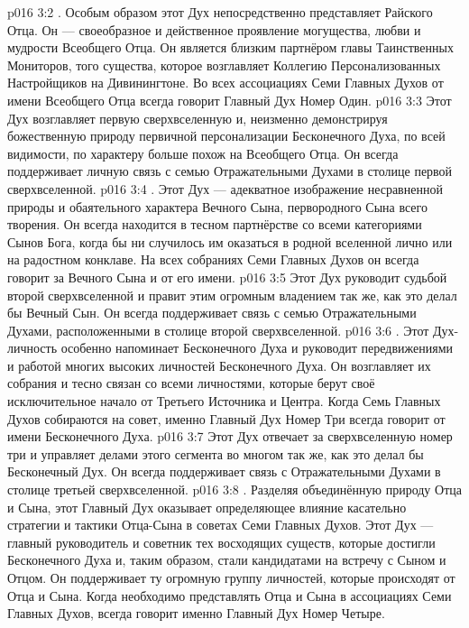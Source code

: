 \vs p016 3:2 . Особым образом этот Дух непосредственно представляет Райского Отца. Он --- своеобразное и действенное проявление могущества, любви и мудрости Всеобщего Отца. Он является близким партнёром главы Таинственных Мониторов, того существа, которое возглавляет Коллегию Персонализованных Настройщиков на Дивинингтоне. Во всех ассоциациях Семи Главных Духов от имени Всеобщего Отца всегда говорит Главный Дух Номер Один.
\vs p016 3:3 Этот Дух возглавляет первую сверхвселенную и, неизменно демонстрируя божественную природу первичной персонализации Бесконечного Духа, по всей видимости, по характеру больше похож на Всеобщего Отца. Он всегда поддерживает личную связь с семью Отражательными Духами в столице первой сверхвселенной.
\vs p016 3:4 \pc {}. Этот Дух --- адекватное изображение несравненной природы и обаятельного характера Вечного Сына, первородного Сына всего творения. Он всегда находится в тесном партнёрстве со всеми категориями Сынов Бога, когда бы ни случилось им оказаться в родной вселенной лично или на радостном конклаве. На всех собраниях Семи Главных Духов он всегда говорит за Вечного Сына и от его имени.
\vs p016 3:5 Этот Дух руководит судьбой второй сверхвселенной и правит этим огромным владением так же, как это делал бы Вечный Сын. Он всегда поддерживает связь с семью Отражательными Духами, расположенными в столице второй сверхвселенной.
\vs p016 3:6 \pc {}. Этот Дух\hyp{}личность особенно напоминает Бесконечного Духа и руководит передвижениями и работой многих высоких личностей Бесконечного Духа. Он возглавляет их собрания и тесно связан со всеми личностями, которые берут своё исключительное начало от Третьего Источника и Центра. Когда Семь Главных Духов собираются на совет, именно Главный Дух Номер Три всегда говорит от имени Бесконечного Духа.
\vs p016 3:7 Этот Дух отвечает за сверхвселенную номер три и управляет делами этого сегмента во многом так же, как это делал бы Бесконечный Дух. Он всегда поддерживает связь с Отражательными Духами в столице третьей сверхвселенной.
\vs p016 3:8 \pc {}. Разделяя объединённую природу Отца и Сына, этот Главный Дух оказывает определяющее влияние касательно стратегии и тактики Отца\hyp{}Сына в советах Семи Главных Духов. Этот Дух --- главный руководитель и советник тех восходящих существ, которые достигли Бесконечного Духа и, таким образом, стали кандидатами на встречу с Сыном и Отцом. Он поддерживает ту огромную группу личностей, которые происходят от Отца и Сына. Когда необходимо представлять Отца и Сына в ассоциациях Семи Главных Духов, всегда говорит именно Главный Дух Номер Четыре.

